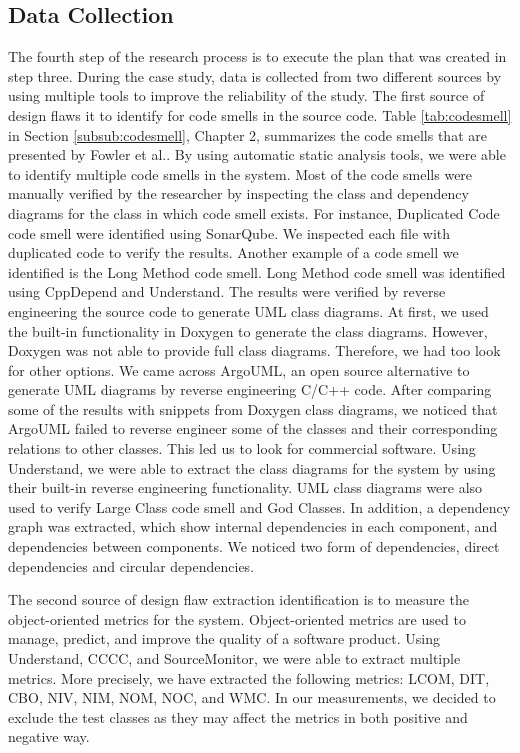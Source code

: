 \subsection{Data Collection}
The fourth step of the research process is to execute the plan that was created in step three. During the case study, data is collected from two different sources by using multiple tools to improve the reliability of the study. The first source of design flaws it to identify for code smells in the source code. Table \ref{tab:codesmell} in Section \ref{subsub:codesmell}, Chapter 2, summarizes the code smells that are presented by Fowler et al.\cite{fowler1999refactoring}. By using automatic static analysis tools, we were able to identify multiple code smells in the system. Most of the code smells were manually verified by the researcher by inspecting the class and dependency diagrams for the class in which code smell exists. For instance, Duplicated Code code smell were identified using SonarQube. We inspected each file with duplicated code to verify the results. Another example of a code smell we identified is the Long Method code smell. Long Method code smell was identified using CppDepend and Understand. The results were verified by reverse engineering the source code to generate UML class diagrams. At first, we used the built-in functionality in Doxygen to generate the class diagrams. However, Doxygen was not able to provide full class diagrams. Therefore, we had too look for other options. We came across ArgoUML, an open source alternative to generate UML diagrams by reverse engineering C/C++ code. After comparing some of the results with snippets from Doxygen class diagrams, we noticed that ArgoUML failed to reverse engineer some of the classes and their corresponding relations to other classes. This led us to look for commercial software. Using Understand, we were able to extract the class diagrams for the system by using their built-in reverse engineering functionality. UML class diagrams were also used to verify Large Class code smell and God Classes. In addition, a dependency graph was extracted, which show internal dependencies in each component, and dependencies between components. We noticed two form of dependencies, direct dependencies and circular dependencies. 

The second source of design flaw extraction identification is to measure the object-oriented metrics for the system. Object-oriented metrics are used to manage, predict, and improve the quality of a software product\cite{rodriguez2001overview}. Using Understand, CCCC, and SourceMonitor, we were able to extract multiple metrics. More precisely, we have extracted the following metrics: LCOM, DIT, CBO, NIV, NIM, NOM, NOC, and WMC. In our measurements, we decided to exclude the test classes as they may affect the metrics in both positive and negative way.




